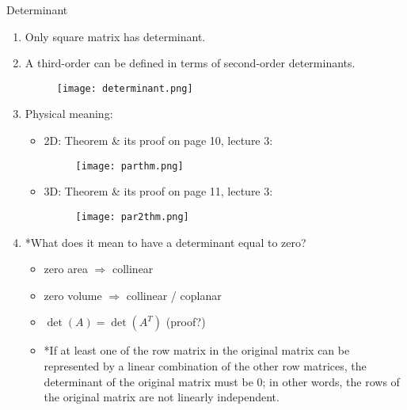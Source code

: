 \documentclass{beamer}
\begin{document}
\begin{frame}[allowframebreaks]{Determinant}
	\begin{enumerate}
		\item Only \alert{square matrix} has determinant.
		
		\item A third-order can be defined in terms of second-order determinants.
		\begin{figure}[H]
			\centering
			\texttt{[image: determinant.png]}
		\end{figure}
		
		\item Physical meaning:
		\begin{itemize}
			\item \alert{2D}: Theorem \& its proof on page 10, lecture 3:
			\begin{figure}[H]
				\centering
				\texttt{[image: parthm.png]}
			\end{figure}
			
			\item \alert{3D}:  Theorem \& its proof on page 11, lecture 3:
			\begin{figure}[H]
				\centering
				\texttt{[image: par2thm.png]}
			\end{figure}
		\end{itemize}
		
		\item *What does it mean to have a determinant equal to zero?
		\begin{itemize}
			\item {\color{blue} zero area} $\Rightarrow$ {\color{red} collinear}
			\item {\color{blue} zero volume} $\Rightarrow$ {\color{red} collinear / coplanar}
			\item $\det(A) = \det(A^T)$ (proof?)
			\item *If at least one of the row matrix in the original matrix can be represented by a \alert{linear combination} of the other row matrices, the determinant of the original matrix must be \alert{0}; in other words, the rows of the original matrix are \alert{not }linearly independent.
		\end{itemize}
		
	\end{enumerate}
	
\end{frame}
\end{document}
